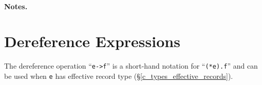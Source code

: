 \paragraph{Notes.} 


\section{Dereference Expressions}
\label{c_expr_dereference}


 The dereference operation ``\lstinline{e->f}'' is a short-hand notation for ``\lstinline{(*e).f}'' and can be used when \lstinline{e} has effective record type (\S\ref{c_types_effective_records}).

